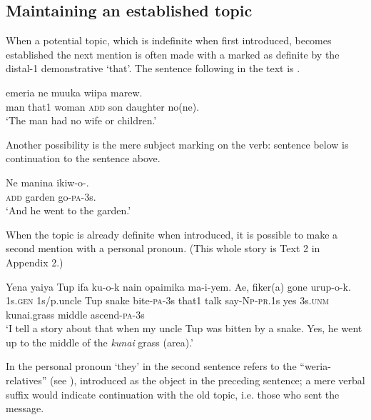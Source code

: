\subsection{Maintaining an established topic} 

When a potential topic, which is indefinite when first introduced, becomes established the next mention is often made with a  marked as definite by the distal-1 demonstrative  `that'. The sentence  following  in the text is . 

\ea%
\label{ex:x1673}
\gll {}   emeria  ne  muuka  wiipa  marew.\\
man  that1  woman  \textsc{add}  son  daughter  no(ne).\\
\glt`The man had no wife or children.'
\z


Another possibility is the mere subject marking on the verb: sentence  below is continuation to the sentence  above. 

\ea%
\label{ex:x1674}
\gll Ne  manina  ikiw-o-. \\
\textsc{add}  garden  go-\textsc{pa}-3s.      \\
\glt`And he went to the garden.'
\z


When the topic is already definite when introduced, it is possible to make a second mention with a personal pronoun. (This whole story is Text 2 in Appendix 2.) 

\ea%
\label{ex:x1919}
\gll Yena  yaiya  Tup  ifa  ku-o-k  nain  opaimika ma-i-yem.  Ae,    fiker(a)  gone  urup-o-k. \\
1s.\textsc{gen}  1s/p.uncle  Tup  snake  bite-\textsc{pa}-3s  that1  talk say-\textsc{Np}-\textsc{pr}.1s  yes  3s.\textsc{unm}  kunai.grass  middle  ascend-\textsc{pa}-3s      \\
\glt`I tell a story about that when my uncle Tup was bitten by a snake. Yes, he went up to the middle of the \textit{kunai} grass (area).'
\z


In  the personal pronoun   `they' in the second sentence refers to the ``weria-relatives'' (see ), introduced as the object in the preceding sentence; a mere verbal suffix would indicate continuation with the old topic, i.e. those who sent the message. 

